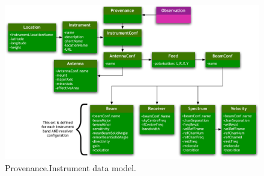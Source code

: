 		\begin{figure}[tbp]
		\begin{center}
		\includegraphics[width=\columnwidth]
		{fig/Provenance-Instrument-DM}
		\end{center}
		\caption[Provenance.Instrument data model]
		{Provenance.Instrument data model.}
		\label{figProvenanceInstrument}
		\end{figure}
		
